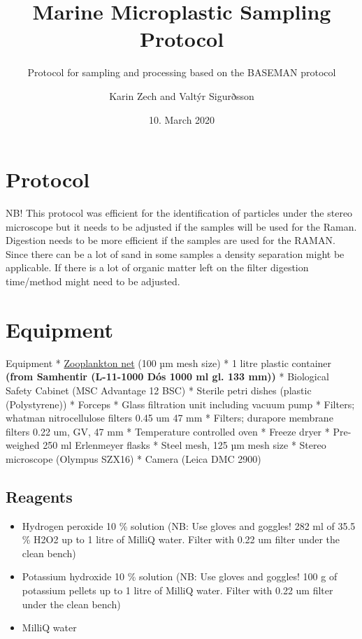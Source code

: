 \documentclass[
  icelandic,
]{book}
\title{{Marine Microplastic Sampling Protocol}}
\subtitle{{Protocol for sampling and processing based on the BASEMAN protocol}}
\author{{Karin Zech and Valtýr Sigurðsson}}
\date{10. March 2020}
\providecommand{\tightlist}{%
  \setlength{\itemsep}{0pt}\setlength{\parskip}{0pt}}
\begin{document}
\maketitle

{
\setcounter{tocdepth}{1}
\tableofcontents
}
\listoftables
\listoffigures
\hypertarget{protocol}{%
\chapter{Protocol}\label{protocol}}

NB! This protocol was efficient for the identification of particles under the stereo microscope but it needs to be adjusted if the samples will be used for the Raman. Digestion needs to be more efficient if the samples are used for the RAMAN. Since there can be a lot of sand in some samples a density separation might be applicable. If there is a lot of organic matter left on the filter digestion time/method might need to be adjusted.

\hypertarget{equipment}{%
\chapter{Equipment}\label{equipment}}

Equipment
* \href{https://www.nhbs.com/plankton-net-250mm-frame-32mm-filter?bkfno=184244}{Zooplankton net} (100 µm mesh size)
* 1 litre plastic container \textbf{(from Samhentir (L-11-1000 Dós 1000 ml gl. 133 mm))}
* Biological Safety Cabinet (MSC Advantage 12 BSC)
* Sterile petri dishes (plastic (Polystyrene))
* Forceps
* Glass filtration unit including vacuum pump
* Filters; whatman nitrocellulose filters 0.45 um 47 mm
* Filters; durapore membrane filters 0.22 um, GV, 47 mm
* Temperature controlled oven
* Freeze dryer
* Pre-weighed 250 ml Erlenmeyer flasks
* Steel mesh, 125 µm mesh size
* Stereo microscope (Olympus SZX16)
* Camera (Leica DMC 2900)

\hypertarget{reagents}{%
\section{Reagents}\label{reagents}}

\begin{itemize}
\tightlist
\item
  Hydrogen peroxide 10 \% solution (NB: Use gloves and goggles! 282 ml of 35.5 \% H2O2 up to 1 litre of MilliQ water. Filter with 0.22 um filter under the clean bench)
\item
  Potassium hydroxide 10 \% solution (NB: Use gloves and goggles! 100 g of potassium pellets up to 1 litre of MilliQ water. Filter with 0.22 um filter under the clean bench)
\item
  MilliQ water
\end{itemize}
\end{document}
